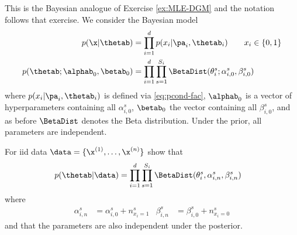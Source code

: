 This is the Bayesian analogue of Exercise \ref{ex:MLE-DGM} and the
notation follows that exercise. We consider the Bayesian model
\begin{align}
  p(\x | \thetab) &= \prod_{i=1}^d p(x_i | \pa_i, \thetab_i) \quad \quad x_i \in \{0,1\} \label{eq:p-dag2}\\
  p(\thetab; \alphab_0, \betab_0) & = \prod_{i=1}^d \prod_{s=1}^{S_i} \BetaDist(\theta_i^s; \alpha_{i,0}^s, \beta_{i,0}^s)
\end{align}
where $p(x_i | \pa_i, \thetab_i)$ is defined via \eqref{eq:pcond-fac}, $\alphab_0$ is a vector of hyperparameters containing all
$\alpha_{i,0}^s$, $\betab_0$ the vector containing all
$\beta_{i,0}^s$, and as before $\BetaDist$ denotes the
Beta distribution. Under the prior, all parameters are independent.

\begin{exenumerate}
\item For iid data $\data = \{\x^{(1)}, \ldots, \x^{(n)}\}$ show that 
  \begin{align}
    p(\thetab | \data) & = \prod_{i=1}^d \prod_{s=1}^{S_i} \BetaDist(\theta_i^s, \alpha_{i,n}^s, \beta_{i,n}^s)
  \end{align}
  where
  \begin{align}
    \alpha_{i,n}^s & = \alpha_{i,0}^s + n_{x_i=1}^s &  \beta_{i,n}^s & = \beta_{i,0}^s + n_{x_i=0}^s
  \end{align}
  and that the parameters are also independent under the posterior.
  

\end{exenumerate}
